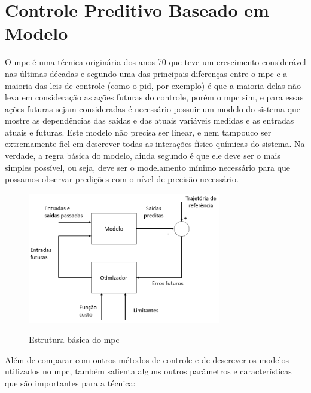 \chapter{Controle Preditivo Baseado em Modelo}
\label{ch:mpc}

O \acrshort{mpc} é uma técnica originária dos anos 70 que teve um crescimento considerável nas últimas
décadas \cite{Camacho2007} e segundo  uma das principais diferenças entre o
\acrshort{mpc} e a maioria das leis de controle (como o \acrshort{pid}, por exemplo) é que a maioria
delas não leva em consideração as ações futuras do controle, porém o \acrshort{mpc} sim, e para essas
ações futuras sejam consideradas é necessário possuir um modelo do sistema que mostre as dependências
das saídas e das atuais variáveis medidas e as entradas atuais e futuras. %
Este modelo não precisa ser linear, e nem tampouco ser extremamente fiel em descrever todas as interações
físico-químicas do sistema. Na verdade, a regra básica do modelo, ainda segundo 
é que ele deve ser o mais simples possível, ou seja, deve ser o modelamento mínimo necessário para que
possamos observar predições com o nível de precisão necessário.

\begin{figure}[h]
    \caption{Estrutura básica do \acrshort{mpc}}
	\begin{center}
		\includegraphics[width=0.75\textwidth]{./5_images/fig_mpc_basic_structure.png} 
		\label{fig:mpc_basic_structure}
    \end{center}
    \centering
\end{figure}

Além de comparar com outros métodos de controle e de descrever os modelos utilizados no \acrshort{mpc},
 também salienta alguns outros parâmetros e características que são importantes
para a técnica:

